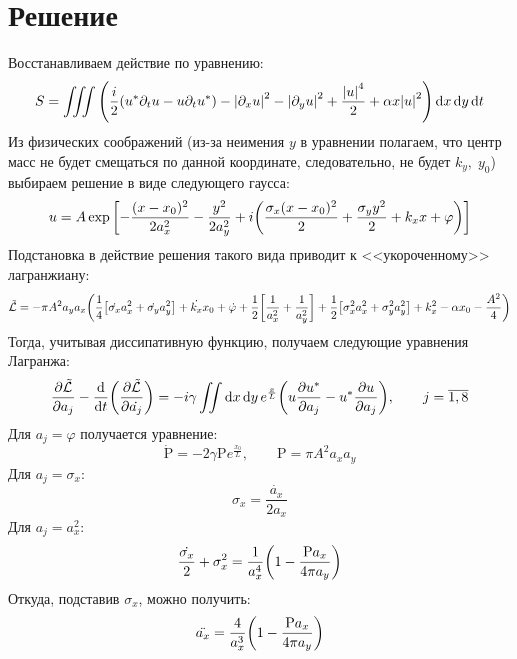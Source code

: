 \documentclass[titlepage]{article}
\begin{document}
\section{Решение}
Восстанавливаем действие по уравнению:
\begin{equation}
 S = \iiint \qty(\dfrac{i}{2} \qty(u^* \partial_t u  -  u\partial_t u^*) - \abs{\partial_x u}^2 - {\abs{\partial_y u}}^2 + \dfrac{{\abs{u}}^4}{2} + \alpha x {\abs{u}}^2) \dd{x} \dd{y} \dd{t}
\end{equation}
Из физических соображений (из-за неимения $y$ в уравнении полагаем, что центр масс не будет смещаться по данной координате, следовательно, не будет $k_y,\; y_0$) выбираем решение в виде следующего гаусса:
\begin{equation}
 u = A \exp\qty[-\dfrac{(x-x_0)^2}{2a_x^2} - \dfrac{y^2}{2a_y^2} + i \qty(\dfrac{\sigma_x (x-x_0)^2}{2} + \dfrac{\sigma_yy^2}{2}+k_xx+\varphi)]
\end{equation}
Подстановка в действие решения такого вида приводит к <<укороченному>> лагранжиану:
\begin{equation}
 \tilde{\mathcal{L}} = -\pi A^2 a_y a_x \qty(\frac14\qty[\dot{\sigma_x}a_x^2+\dot{\sigma_y}a_y^2]+\dot{k_x}x_0+\dot{\varphi}+\frac12\qty[\frac{1}{a_x^2}+\frac{1}{a_y^2}]+\frac12\qty[\sigma_x^2a_x^2+\sigma_y^2a_y^2]+k_x^2-\alpha x_0 - \frac{A^2}{4})
\end{equation}
Тогда, учитывая диссипативную функцию, получаем следующие уравнения Лагранжа:
\begin{equation}
 \pdv{\tilde{\mathcal{L}}}{a_j} - \dv{t}(\pdv{\tilde{\mathcal{L}}}{\dot{a_j}}) = -i\gamma\iint\dd{x}\dd{y}e^{\frac{x}{L}}\qty(u \pdv{u^*}{a_j}-u^* \pdv{u}{a_j}),\qquad j=\overline{1,8}
\end{equation}
Для $a_j = \varphi$ получается уравнение:
\begin{equation}\label{P}
 \dot{\mathrm{P}} = -2\gamma \mathrm{P} e^{\frac{x_0}{L}}, \qquad \mathrm{P} =\pi A^2a_xa_y
\end{equation}
Для $a_j = \sigma_x$:
\begin{equation}
 \sigma_x = \dfrac{\dot{a_x}}{2a_x}
\end{equation}
Для $a_j = a_x^2$:
\begin{equation}
 \frac{\dot{\sigma_x}}{2} + \sigma_x^2 = \frac{1}{a_x^4} \qty(1 - \frac{\mathrm{P}a_x}{4\pi a_y})
\end{equation}
Откуда, подставив $\sigma_x$, можно получить:
\begin{equation}
 \ddot{a_x} = \frac{4}{a_x^3} \qty(1 - \frac{\mathrm{P}a_x}{4\pi a_y})
\end{equation}
\end{document}
